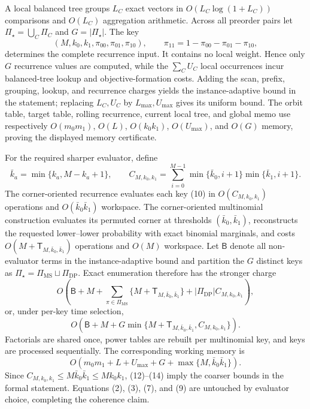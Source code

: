 A local balanced tree groups \(L_C\) exact vectors in \(O(L_C\log(1+L_C))\) comparisons and \(O(L_C)\) aggregation arithmetic. Across all preorder pairs let \(\Pi_\star=\bigcup_C\Pi_C\) and \(G=|\Pi_\star|\). The key
\[
(M,k_0,k_1,\pi_{00},\pi_{01},\pi_{10}),\qquad \pi_{11}=1-\pi_{00}-\pi_{01}-\pi_{10},
\tag{10}
\]
determines the complete recurrence input. It contains no local weight. Hence only \(G\) recurrence values are computed, while the \(\sum_CU_C\) local occurrences incur balanced-tree lookup and objective-formation costs. Adding the scan, prefix, grouping, lookup, and recurrence charges yields the instance-adaptive bound in the statement; replacing \(L_C,U_C\) by \(L_{\max},U_{\max}\) gives its uniform bound. The orbit table, target table, rolling recurrence, current local tree, and global memo use respectively \(O(m_0m_1)\), \(O(L)\), \(O(k_0k_1)\), \(O(U_{\max})\), and \(O(G)\) memory, proving the displayed memory certificate.

For the required sharper evaluator, define
\[
\bar k_a=\min\{k_a,M-k_a+1\},\qquad C_{M,k_0,k_1}=\sum_{i=0}^{M-1}\min\{\bar k_0,i+1\}\min\{\bar k_1,i+1\}.
\tag{11}
\]
The corner-oriented recurrence evaluates each key (10) in \(O(C_{M,k_0,k_1})\) operations and \(O(\bar k_0\bar k_1)\) workspace. The corner-oriented multinomial construction evaluates its permuted corner at thresholds \((\bar k_0,\bar k_1)\), reconstructs the requested lower--lower probability with exact binomial marginals, and costs \(O(M+\mathsf T_{M,\bar k_0,\bar k_1})\) operations and \(O(M)\) workspace. Let \(\mathsf B\) denote all non-evaluator terms in the instance-adaptive bound and partition the \(G\) distinct keys as \(\Pi_\star=\Pi_{\mathrm{MS}}\sqcup\Pi_{\mathrm{DP}}\). Exact enumeration therefore has the stronger charge
\[
O\!\left(\mathsf B+M+\sum_{\pi\in\Pi_{\mathrm{MS}}}\{M+\mathsf T_{M,\bar k_0,\bar k_1}\}+|\Pi_{\mathrm{DP}}|C_{M,k_0,k_1}\right),
\tag{12}
\]
or, under per-key time selection,
\[
O\!\left(\mathsf B+M+G\min\{M+\mathsf T_{M,\bar k_0,\bar k_1},C_{M,k_0,k_1}\}\right).
\tag{13}
\]
Factorials are shared once, power tables are rebuilt per multinomial key, and keys are processed sequentially. The corresponding working memory is
\[
O\!\left(m_0m_1+L+U_{\max}+G+\max\{M,\bar k_0\bar k_1\}\right).
\tag{14}
\]
Since \(C_{M,k_0,k_1}\le M\bar k_0\bar k_1\le Mk_0k_1\), (12)--(14) imply the coarser bounds in the formal statement. Equations (2), (3), (7), and (9) are untouched by evaluator choice, completing the coherence claim.